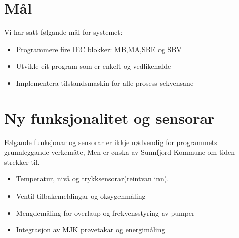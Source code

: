 \newpage
\section{Mål}
Vi har satt følgande mål for systemet:

\begin{itemize}
    \item Programmere fire \gls{IEC} blokker: \gls{MB},\gls{MA},\gls{SBE} og \gls{SBV}
    \item Utvikle eit program som er enkelt og vedlikehalde
    \item Implementera tilstandsmaskin for alle prosess sekvensane
\end{itemize}

\section{Ny funksjonalitet og sensorar}
Følgande funksjonar og sensorar er ikkje nødvendig for programmets grunnleggande verkemåte, Men 
er ønska av \gls{Sunnfjord Kommune} om tiden strekker til.  
\begin{itemize}
    \item Temperatur, nivå og trykksensorar(reintvan inn).
    \item Ventil tilbakemeldingar og oksygenmåling
    \item Mengdemåling for overlaup og frekvensstyring av pumper
    \item Integrasjon av \gls{MJK} prøvetakar og energimåling
\end{itemize}

